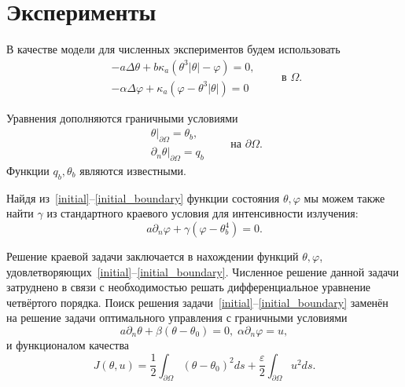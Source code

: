\documentclass[10pt]{article}
\begin{document}
    \section{Эксперименты}

    В качестве модели для численных экспериментов будем использовать
    \begin{equation}
        \label{initial}
        \begin{aligned}
            - a \Delta \theta + b \kappa_a(\theta ^ 3 | \theta | - \varphi) = 0,  \\
            - \alpha \Delta \varphi + \kappa_a (\varphi - \theta ^3 | \theta |) = 0
        \end{aligned}
        \qquad \text{в } \Omega.
    \end{equation}

    Уравнения дополняются граничными условиями
    \begin{equation}
        \label{initial_boundary}
        \begin{aligned}
            \theta|_{\partial \Omega} = \theta_b, \\
            \partial_n \theta |_{\partial \Omega} = q_b
        \end{aligned}
        \qquad \text{на } \partial \Omega.
    \end{equation}
    Функции $q_b, \theta_b$ являются известными.

    Найдя из~\eqref{initial}--\eqref{initial_boundary} функции состояния
    $\theta, \varphi$ мы можем также найти $\gamma$ из стандартного
    краевого условия для интенсивности излучения:
    \begin{equation}
        \label{initial_boundary_phi}
        a \partial_n \varphi + \gamma (\varphi -\theta_b^4) = 0.
    \end{equation}

    Решение краевой задачи заключается в нахождении функций $\theta, \varphi$,
    удовлетворяющих~\eqref{initial}--\eqref{initial_boundary}.
    Численное решение данной задачи затруднено в связи с необходимостью решать
    дифференциальное уравнение четвёртого порядка.
    Поиск решения задачи~\eqref{initial}--\eqref{initial_boundary}
    заменён на решение задачи оптимального управления с граничными условиями
    \begin{equation}
        \label{initial_boundary_2}
        a \partial_n \theta + \beta (\theta -\theta_0) = 0, \; \alpha \partial_n \varphi = u,
    \end{equation}
    и функционалом качества
    \begin{equation}
        \label{quality}
        J(\theta, u) = \frac{1}{2} \int_{\partial \Omega}
        (\theta - \theta_0)^2 ds + \frac{\varepsilon}{2} \int_{\partial \Omega} u^2 ds.
    \end{equation}
\end{document}
